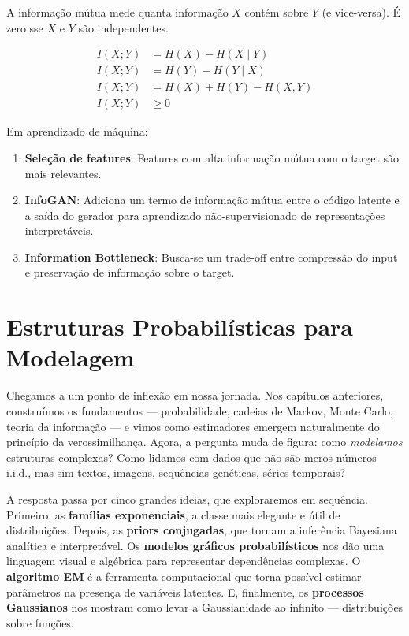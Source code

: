 \documentclass{tufte-handout}
\begin{document}
A informação mútua mede quanta informação $X$ contém sobre $Y$ (e vice-versa).
É zero sse $X$ e $Y$ são independentes.

\begin{prop}
    \begin{align*}
        I(X; Y) &= H(X) - H(X \mid Y) \\
        I(X; Y) &= H(Y) - H(Y \mid X) \\
        I(X; Y) &= H(X) + H(Y) - H(X, Y) \\
        I(X; Y) &\ge 0
    \end{align*}
\end{prop}

Em aprendizado de máquina:
\begin{enumerate}
    \item \textbf{Seleção de features}: Features com alta informação mútua com o target
    são mais relevantes.
    \item \textbf{InfoGAN}: Adiciona um termo de informação mútua entre o código latente
    e a saída do gerador para aprendizado não-supervisionado de representações
    interpretáveis.
    \item \textbf{Information Bottleneck}: Busca-se um trade-off entre compressão do input
    e preservação de informação sobre o target.
\end{enumerate}

\part{Estruturas Probabilísticas para Modelagem}

Chegamos a um ponto de inflexão em nossa jornada. Nos capítulos anteriores, construímos os fundamentos --- probabilidade, cadeias de Markov, Monte Carlo, teoria da informação --- e vimos como estimadores emergem naturalmente do princípio da verossimilhança. Agora, a pergunta muda de figura: como \textit{modelamos} estruturas complexas? Como lidamos com dados que não são meros números i.i.d., mas sim textos, imagens, sequências genéticas, séries temporais?

A resposta passa por cinco grandes ideias, que exploraremos em sequência. Primeiro, as \textbf{famílias exponenciais}, a classe mais elegante e útil de distribuições. Depois, as \textbf{priors conjugadas}, que tornam a inferência Bayesiana analítica e interpretável. Os \textbf{modelos gráficos probabilísticos} nos dão uma linguagem visual e algébrica para representar dependências complexas. O \textbf{algoritmo EM} é a ferramenta computacional que torna possível estimar parâmetros na presença de variáveis latentes. E, finalmente, os \textbf{processos Gaussianos} nos mostram como levar a Gaussianidade ao infinito --- distribuições sobre funções.
\end{document}
